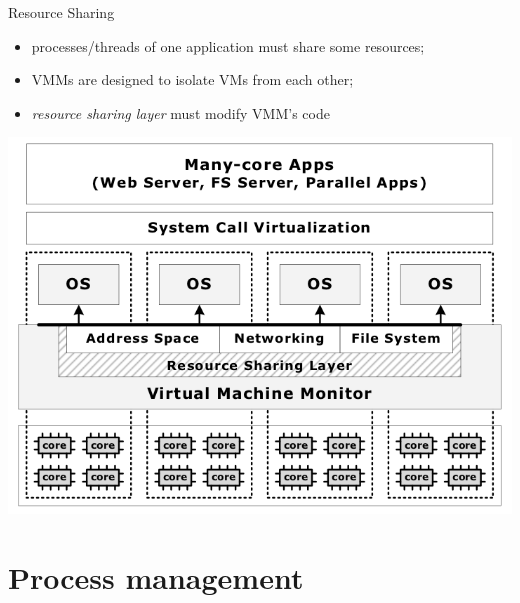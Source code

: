 \documentclass{beamer}
\begin{document}
\begin{frame}{Resource Sharing}
  \begin{itemize}
    \item processes/threads of one application must share some
      resources;
    \item VMMs are designed to isolate VMs from each other;
    \item \emph{resource sharing layer} must modify VMM's code
  \end{itemize}
  \begin{center}
    \includegraphics[scale=0.3]{overview.png}
  \end{center}
\end{frame}


\section{Process management}
\end{document}
